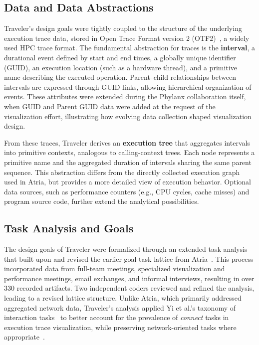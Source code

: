 \begin{refsection}
\subsection{Data and Data Abstractions}
\label{sec:traveler-data}

Traveler's design goals were tightly coupled to the structure of the underlying execution trace data, stored in Open Trace Format version 2 (OTF2)~\cite{OTF2}, a widely used HPC trace format. The fundamental abstraction for traces is the \textbf{interval}, a durational event defined by start and end times, a globally unique identifier (GUID), an execution location (such as a hardware thread), and a primitive name describing the executed operation. Parent–child relationships between intervals are expressed through GUID links, allowing hierarchical organization of events. These attributes were extended during the Phylanx collaboration itself, when GUID and Parent GUID data were added at the request of the visualization effort, illustrating how evolving data collection shaped visualization design.

From these traces, Traveler derives an \textbf{execution tree} that aggregates intervals into primitive contexts, analogous to calling-context trees. Each node represents a primitive name and the aggregated duration of intervals sharing the same parent sequence. This abstraction differs from the directly collected execution graph used in Atria, but provides a more detailed view of execution behavior. Optional data sources, such as performance counters (e.g., CPU cycles, cache misses) and program source code, further extend the analytical possibilities.

\subsection{Task Analysis and Goals}
\label{sec:traveler-tasks}

The design goals of Traveler were formalized through an extended task analysis that built upon and revised the earlier goal-task lattice from Atria~\cite{williams2020movingtarget}. This process incorporated data from full-team meetings, specialized visualization and performance meetings, email exchanges, and informal interviews, resulting in over 330 recorded artifacts. Two independent coders reviewed and refined the analysis, leading to a revised lattice structure. Unlike Atria, which primarily addressed aggregated network data, Traveler's analysis applied Yi et al.'s taxonomy of interaction tasks~\cite{Yi2007} to better account for the prevalence of \textit{connect} tasks in execution trace visualization, while preserving network-oriented tasks where appropriate~\cite{Lee2006}.


\end{refsection}
